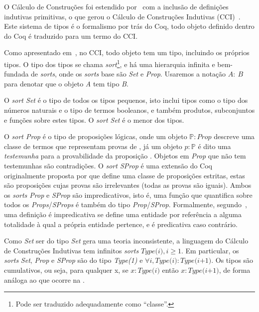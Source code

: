 		O Cálculo de Construções foi estendido por~ com a inclusão de definições indutivas primitivas, o que gerou o
		Cálculo de Construções Indutivas (CCI)~\cite{coqteam2022manual}. Este sistema de tipos é o formalismo por trás do Coq, todo objeto
		definido dentro do Coq é traduzido para um termo do CCI.

		Como apresentado em~, no CCI, todo objeto tem um tipo, incluindo os próprios tipos.
		O tipo dos tipos se chama \textit{sort}\footnote{Pode ser traduzido adequadamente como ``classe''.}, e há uma hierarquia infinita e bem-fundada de \textit{sorts},
		onde os \textit{sorts} base são \textit{Set} e \textit{Prop}. Usaremos a notação \(A:\ B\) para denotar que o objeto \textit{A} tem tipo \textit{B}.

		O \textit{sort Set} é o tipo de todos os tipos pequenos, isto inclui tipos como o
		tipo dos números naturais e o tipo de termos booleanos, e também produtos, subconjuntos e funções sobre estes tipos. O \textit{sort Set} é o menor dos tipos.

		O \textit{sort Prop} é o tipo de proposições lógicas, onde um objeto \(\mathbb{P}: \textit{Prop}\) descreve uma classe de termos que representam
		provas de , já um objeto \(\textit{p}: \mathbb{P}\) é dito uma \textit{testemunha} para a provabilidade da proposição .
		Objetos em \textit{Prop} que não tem testemunhas são contradições.
		O \textit{sort SProp} é uma extensão do Coq originalmente proposta por  que define uma classe de
		proposições estritas, estas são proposições cujas provas são irrelevantes (todas as provas são iguais).
		Ambos os \textit{sorts Prop} e \textit{SProp} são impredicativos, isto é, uma função que quantifica sobre todos os \textit{Props}/\textit{SProps} é
		também do tipo \textit{Prop}/\textit{SProp}. Formalmente, segundo~, uma definição é impredicativa se define
		uma entidade por referência a alguma totalidade à qual a própria entidade pertence, e é predicativa caso contrário.

		Como \textit{Set} ser do tipo \textit{Set} gera uma teoria inconsistente, a linguagem do Cálculo de Construções Indutivas tem infinitos \textit{sorts}
		\(\textit{Type(i)}, i \geq 1\). Em particular, os \textit{sorts} \textit{Set}, \textit{Prop} e \textit{SProp} são do tipo \textit{Type(1)} e
		\(\forall i, \textit{Type(i)}: \textit{Type(i+1)}\). Os tipos são cumulativos, ou seja, para qualquer x, se \(x: \textit{Type(i)}\) então \(x: \textit{Type(i+1)}\),
		de forma análoga ao que ocorre na \TTML.

